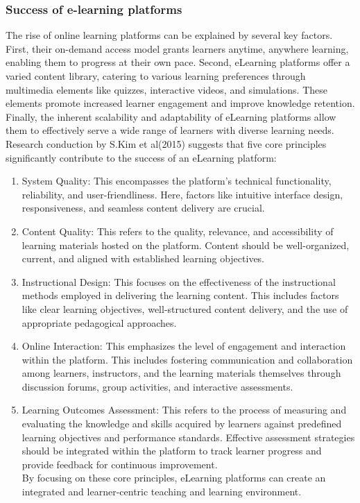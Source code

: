 \documentclass[a4paper,12pt]{article}  %
\begin{document}
\subsubsection{Success of  e-learning  platforms}
The rise of online learning platforms can be explained by several key factors.
First, their on-demand access model grants learners anytime, anywhere learning,
enabling them to progress at their own pace. Second, eLearning platforms offer
a varied content library, catering to various learning preferences through
multimedia elements like quizzes, interactive videos, and simulations. These
elements promote increased learner engagement and improve knowledge retention.
Finally, the inherent scalability and adaptability of eLearning platforms allow
them to effectively serve a wide range of learners with diverse learning needs.
Research conduction by S.Kim et al(2015)\cite{kim2023better} suggests that five core principles
significantly contribute to the success of an eLearning platform:\\

\begin{enumerate}
  \item System Quality: This encompasses the platform's technical functionality,
        reliability, and user-friendliness. Here, factors like intuitive interface
        design, responsiveness, and seamless content delivery are crucial.\\
  \item Content Quality: This refers to the quality, relevance, and accessibility of
        learning materials hosted on the platform. Content should be well-organized,
        current, and aligned with established learning objectives.\\
  \item Instructional Design: This focuses on the effectiveness of the instructional
        methods employed in delivering the learning content. This includes factors like
        clear learning objectives, well-structured content delivery, and the use of
        appropriate pedagogical approaches.\\
  \item Online Interaction: This emphasizes the level of engagement and interaction
        within the platform. This includes fostering communication and collaboration
        among learners, instructors, and the learning materials themselves through
        discussion forums, group activities, and interactive assessments.\\
  \item Learning Outcomes Assessment: This refers to the process of measuring and
        evaluating the knowledge and skills acquired by learners against predefined
        learning objectives and performance standards. Effective assessment strategies
        should be integrated within the platform to track learner progress and provide
        feedback for continuous improvement.\\

        By focusing on these core principles, eLearning platforms can create an
        integrated and learner-centric teaching and learning environment.
\end{enumerate}
\end{document}
